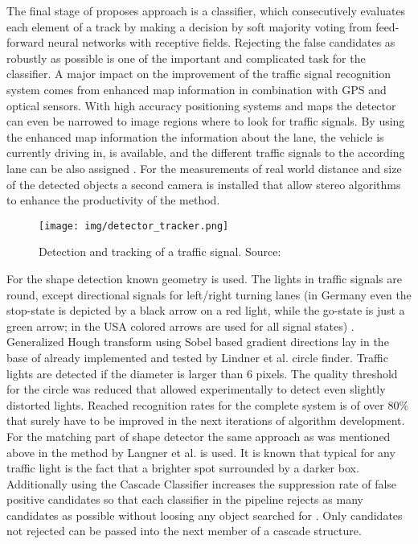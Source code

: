 \documentclass[letterpaper, 10 pt, conference]{ieeeconf} %
\begin{document}
The final stage of proposes approach is a classifier, which consecutively evaluates each element of a track by making a decision by soft majority voting from feed-forward neural networks with receptive fields. Rejecting the false candidates as robustly as possible is one of the important and complicated task for the classifier. A major impact on the improvement of the traffic signal recognition system comes from enhanced map information in combination with GPS and optical sensors. With high accuracy positioning systems and maps the detector can even be narrowed to image regions where to look for traffic signals. By using the enhanced map information the information about the lane, the vehicle is currently driving in, is available, and the different traffic signals to the according lane can be also assigned \cite{c6}. For the measurements of real world distance and size of the detected objects a second camera is installed that allow stereo algorithms to enhance the productivity of the method.

\begin{figure}[thpb]
	\centering
	\texttt{[image: img/detector\_tracker.png]}
	\caption{Detection and tracking of a traffic signal. Source: \cite{c6}}
	\label{dettrack}
\end{figure}

For the shape detection known geometry is used. The lights in traffic signals are round, except directional signals for left/right turning lanes (in Germany even the stop-state is depicted by a black arrow on a red light, while the go-state is just a green arrow; in the USA colored arrows are used for all signal states) \cite{c6}. Generalized Hough transform using Sobel based gradient directions lay in the base of already implemented and tested by Lindner et al. circle finder. Traffic lights are detected if the diameter is larger than 6 pixels. The quality threshold for the circle was reduced that allowed experimentally to detect even slightly distorted lights. Reached recognition rates for the complete system is of over 80\% that surely have to be improved in the next iterations of algorithm development. For the matching part of shape detector the same approach as was mentioned above in the method by Langner et al. is used. It is known that typical for any traffic light is the fact that a brighter spot surrounded by a darker box. Additionally using the Cascade Classifier increases the suppression rate of false positive candidates so that each classifier in the pipeline rejects as many candidates as possible without loosing any object searched for \cite{c6}. Only candidates not rejected can be passed into the next member of a cascade structure. 
\end{document}
